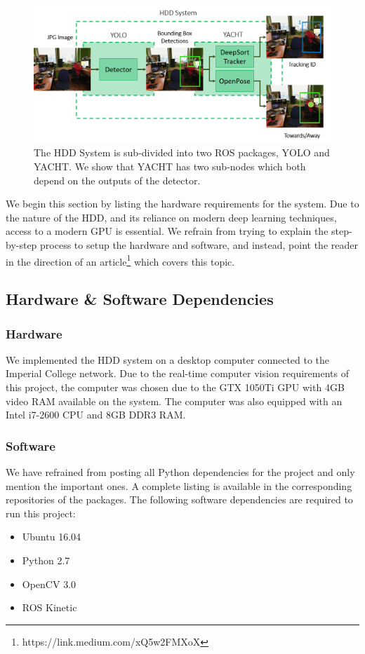 \begin{figure}[ht]
    \centering
    \includegraphics[width=1.0\linewidth]{img/chapter5_implementation/hddSystemDiagram.png}
    \caption{The HDD System is sub-divided into two ROS packages, YOLO and YACHT. We show that YACHT has two sub-nodes which both depend on the outputs of the detector.}
    \label{fig:detailedHDD}
\end{figure}

We begin this section by listing the hardware requirements for the system. Due to the nature of the HDD, and its reliance on modern deep learning techniques, access to a modern GPU is essential. We refrain from trying to explain the step-by-step process to setup the hardware and software, and instead, point the reader in the direction of an article\footnote{https://link.medium.com/xQ5w2FMXoX} which covers this topic.

\subsection{Hardware \& Software Dependencies}

\subsubsection{Hardware}
We implemented the HDD system on a desktop computer connected to the Imperial College network. Due to the real-time computer vision requirements of this project, the computer was chosen due to the GTX 1050Ti GPU with 4GB video RAM available on the system. The computer was also equipped with an Intel i7-2600 CPU and 8GB DDR3 RAM.

\subsubsection{Software}
We have refrained from posting all Python dependencies for the project and only mention the important ones. A complete listing is available in the corresponding repositories of the packages. The following software dependencies are required to run this project:
\begin{itemize}
    \item Ubuntu 16.04
    \item Python 2.7
    \item OpenCV 3.0
    \item ROS Kinetic
\end{itemize}

